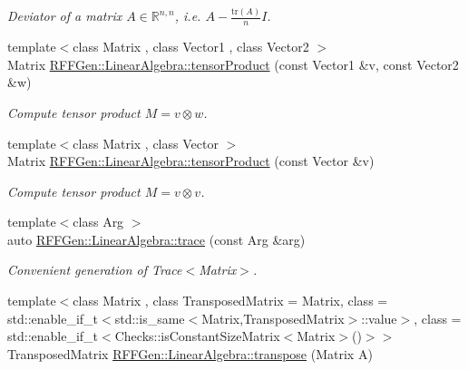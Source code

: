 \begin{DoxyCompactItemize}
\begin{DoxyCompactList}\small\item\em Deviator of a matrix $ A\in\mathbb{R}^{n,n} $, i.\-e. $ A - \frac{\mathrm{tr}(A)}{n}I $. \end{DoxyCompactList}\item 
\hypertarget{group__LinearAlgebraGroup_gaa8e93771d2ca8b05ab77449c2b3f9b38}{{\footnotesize template$<$class Matrix , class Vector1 , class Vector2 $>$ }\\Matrix \hyperlink{group__LinearAlgebraGroup_gaa8e93771d2ca8b05ab77449c2b3f9b38}{R\-F\-F\-Gen\-::\-Linear\-Algebra\-::tensor\-Product} (const Vector1 \&v, const Vector2 \&w)}\label{group__LinearAlgebraGroup_gaa8e93771d2ca8b05ab77449c2b3f9b38}

\begin{DoxyCompactList}\small\item\em Compute tensor product $ M = v \otimes w $. \end{DoxyCompactList}\item 
\hypertarget{group__LinearAlgebraGroup_gac2461ba581a9fd80f9c622c5a15c3bfc}{{\footnotesize template$<$class Matrix , class Vector $>$ }\\Matrix \hyperlink{group__LinearAlgebraGroup_gac2461ba581a9fd80f9c622c5a15c3bfc}{R\-F\-F\-Gen\-::\-Linear\-Algebra\-::tensor\-Product} (const Vector \&v)}\label{group__LinearAlgebraGroup_gac2461ba581a9fd80f9c622c5a15c3bfc}

\begin{DoxyCompactList}\small\item\em Compute tensor product $ M = v \otimes v $. \end{DoxyCompactList}\item 
{\footnotesize template$<$class Arg $>$ }\\auto \hyperlink{group__LinearAlgebraGroup_ga8ede749982d71c466cfe12d92541a504}{R\-F\-F\-Gen\-::\-Linear\-Algebra\-::trace} (const Arg \&arg)
\begin{DoxyCompactList}\small\item\em Convenient generation of Trace$<$\-Matrix$>$. \end{DoxyCompactList}\item 
\hypertarget{group__LinearAlgebraGroup_ga547f56fe3fddb39aad3e80e94866a98b}{{\footnotesize template$<$class Matrix , class Transposed\-Matrix  = Matrix, class  = std\-::enable\-\_\-if\-\_\-t$<$std\-::is\-\_\-same$<$\-Matrix,\-Transposed\-Matrix$>$\-::value$>$, class  = std\-::enable\-\_\-if\-\_\-t$<$\-Checks\-::is\-Constant\-Size\-Matrix$<$\-Matrix$>$()$>$$>$ }\\Transposed\-Matrix \hyperlink{group__LinearAlgebraGroup_ga547f56fe3fddb39aad3e80e94866a98b}{R\-F\-F\-Gen\-::\-Linear\-Algebra\-::transpose} (Matrix A)}\label{group__LinearAlgebraGroup_ga547f56fe3fddb39aad3e80e94866a98b}


\end{DoxyCompactItemize}
